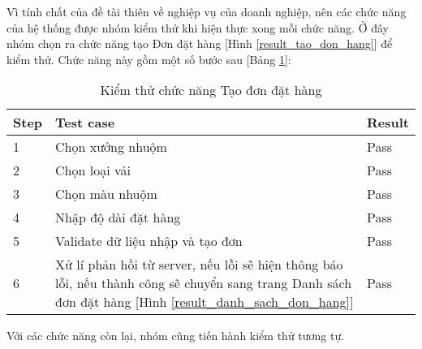 Vì tính chất của đề tài thiên về nghiệp vụ của doanh nghiệp, nên các chức năng của hệ thống được nhóm kiểm thử khi hiện thực xong mỗi chức năng. Ở đây nhóm chọn ra chức năng tạo Đơn đặt hàng [Hình \ref{result_tao_don_hang}] để kiểm thử. Chức năng này gồm một số bước sau [Bảng \ref{test_tao_don_hang}]:

\begin{table}[H]
    \centering
    \begin{tabular}{|m{1.5cm}|m{10cm}|m{1.5cm}|}
    \hline 
    \textbf{Step} & \textbf{Test case} & \textbf{Result} \\ \hline
    1 & Chọn xưởng nhuộm & Pass \\ \hline
    2 & Chọn loại vải & Pass \\ \hline
    3 & Chọn màu nhuộm & Pass \\ \hline
    4 & Nhập độ dài đặt hàng & Pass \\ \hline
    5 & Validate dữ liệu nhập và tạo đơn & Pass \\ \hline
    6 & Xử lí phản hồi từ server, nếu lỗi sẽ hiện thông báo lỗi, nếu thành công sẽ chuyển sang trang Danh sách đơn đặt hàng [Hình \ref{result_danh_sach_don_hang}] & Pass \\ \hline
    \end{tabular}
    \caption{Kiểm thử chức năng Tạo đơn đặt hàng}
    \label{test_tao_don_hang}
\end{table}

Với các chức năng còn lại, nhóm cũng tiến hành kiểm thử tương tự.
